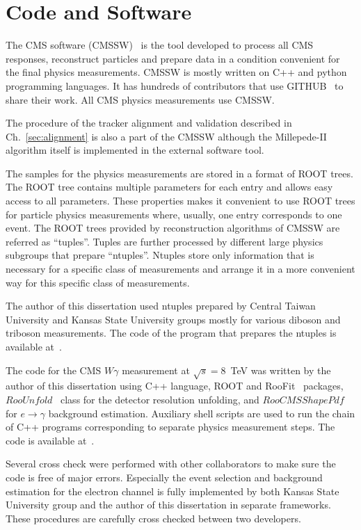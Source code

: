 \chapter{Code and Software}
\label{sec:Code}


The CMS software (CMSSW)~\cite{ref_CMSSW} is the tool developed to process all CMS responses, reconstruct particles and prepare data in a condition convenient for the final physics measurements. CMSSW is mostly written on C++ and python programming languages. It has hundreds of contributors that use GITHUB~\cite{ref_GITHUB} to share their work. All CMS physics measurements use CMSSW.

The procedure of the tracker alignment and validation described in Ch.~\ref{sec:alignment} is also a part of the CMSSW although the Millepede-II algorithm itself is implemented in the external software tool.

The samples for the physics measurements are stored in a format of ROOT trees. The ROOT tree contains multiple parameters for each entry and allows easy access to all parameters. These properties makes it convenient to use ROOT trees for particle physics measurements where, usually, one entry corresponds to one event. The ROOT trees provided by reconstruction algorithms of CMSSW are referred as ``tuples''. Tuples are further processed by different large physics subgroups that prepare ``ntuples''. Ntuples store only information that is necessary for a specific class of measurements and arrange it in a more convenient way for this specific class of measurements.  

The author of this dissertation used ntuples prepared by Central Taiwan University and Kansas State University groups mostly for various diboson and triboson measurements. The code of the program that prepares the ntuples is available at~\cite{ref_ggNtuplizer}.

The code for the CMS $W\gamma$ measurement at $\sqrt{s}=8$~TeV was written by the author of this dissertation using C++ language, ROOT and RooFit~\cite{ref_RooFit} packages, $RooUnfold$~\cite{ref_RooUnfold} class for the detector resolution unfolding, and $RooCMSShapePdf$~\cite{ref_RooCMSShapePdf} for $e\rightarrow\gamma$ background estimation. Auxiliary shell scripts are used to run the chain of C++ programs corresponding to separate physics measurement steps. The code is available at~\cite{ref_GITHUB}.

Several cross check were performed with other collaborators to make sure the code is free of major errors. Especially the event selection and background estimation for the electron channel is fully implemented by both Kansas State University group and the author of this dissertation in separate frameworks. These procedures are carefully cross checked between two developers.  
